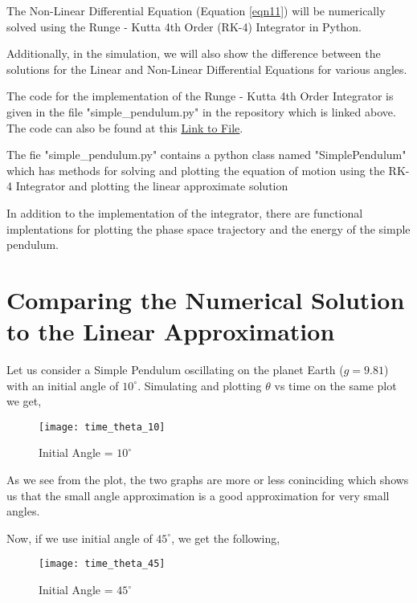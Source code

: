 \documentclass[12pt]{article}
\begin{document}
The Non-Linear Differential Equation (Equation \ref{eqn11}) will be numerically solved using the
Runge - Kutta 4th Order (RK-4) Integrator in Python.

Additionally, in the simulation, we will also show the difference between the solutions for
the Linear and Non-Linear Differential Equations for various angles. \newline

The code for the implementation of the Runge - Kutta 4th Order Integrator is given in the file "simple\_pendulum.py"
in the repository which is linked above. The code can also be found at this \textcolor{blue}{\underline{\href{https://github.com/kkin1995/simulations/simple_pendulum.py}{Link to File}}}. \newline

The fie "simple\_pendulum.py" contains a python class named "SimplePendulum" which has methods for solving and plotting the equation of motion using
the RK-4 Integrator and plotting the linear approximate solution \newline

In addition to the implementation of the integrator, there are functional implentations for plotting the phase space trajectory and the energy
of the simple pendulum. \newline

\section{Comparing the Numerical Solution to the Linear Approximation}

Let us consider a Simple Pendulum oscillating on the planet Earth ($g = 9.81$) with an initial angle of $10^\circ$. Simulating and plotting
$\theta$ vs time on the same plot we get,

\begin{figure}[H]
    \centering
    \caption{Initial Angle = $10^\circ$}
    \texttt{[image: time\_theta\_10]}
    \label{fig:theta10}
\end{figure}

As we see from the plot, the two graphs are more or less coninciding which shows us that the small angle approximation is a good approximation for
very small angles.

Now, if we use initial angle of $45^\circ$, we get the following,

\begin{figure}[H]
    \centering
    \caption{Initial Angle = $45^\circ$}
    \texttt{[image: time\_theta\_45]}
    \label{fig:theta45}
\end{figure}
\end{document}
